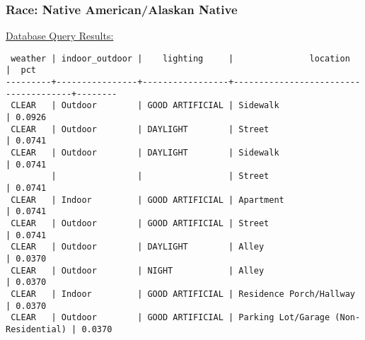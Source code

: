 \documentclass[10pt]{article}
\begin{document}
\subsubsection*{Race: Native American/Alaskan Native}

\underline{Database Query Results:}

\begin{verbatim}
 weather | indoor_outdoor |    lighting     |               location               |  pct
---------+----------------+-----------------+--------------------------------------+--------
 CLEAR   | Outdoor        | GOOD ARTIFICIAL | Sidewalk                             | 0.0926
 CLEAR   | Outdoor        | DAYLIGHT        | Street                               | 0.0741
 CLEAR   | Outdoor        | DAYLIGHT        | Sidewalk                             | 0.0741
         |                |                 | Street                               | 0.0741
 CLEAR   | Indoor         | GOOD ARTIFICIAL | Apartment                            | 0.0741
 CLEAR   | Outdoor        | GOOD ARTIFICIAL | Street                               | 0.0741
 CLEAR   | Outdoor        | DAYLIGHT        | Alley                                | 0.0370
 CLEAR   | Outdoor        | NIGHT           | Alley                                | 0.0370
 CLEAR   | Indoor         | GOOD ARTIFICIAL | Residence Porch/Hallway              | 0.0370
 CLEAR   | Outdoor        | GOOD ARTIFICIAL | Parking Lot/Garage (Non-Residential) | 0.0370
\end{verbatim}
\end{document}

